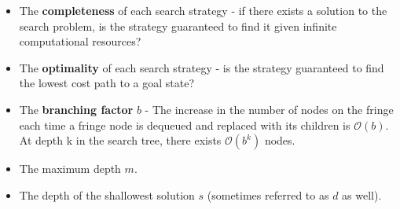 \documentclass{article}[letterpaper]
\begin{document}
\begin{itemize}
\item The \textbf{completeness} of each search strategy - if there exists a solution to the search problem, is the
strategy guaranteed to find it given infinite computational resources?

\item The \textbf{optimality} of each search strategy - is the strategy guaranteed to find the lowest cost path to a
goal state?

\item The \textbf{branching factor} $b$ - The increase in the number of nodes on the fringe each time a fringe node
is dequeued and replaced with its children is $\mathcal{O}(b)$. At depth k in the search tree, there exists 
$\mathcal{O}(b^k)$ nodes.

\item The maximum depth $m$.

\item The depth of the shallowest solution $s$ (sometimes referred to as $d$ as well).  

\end{itemize}
\end{document}
